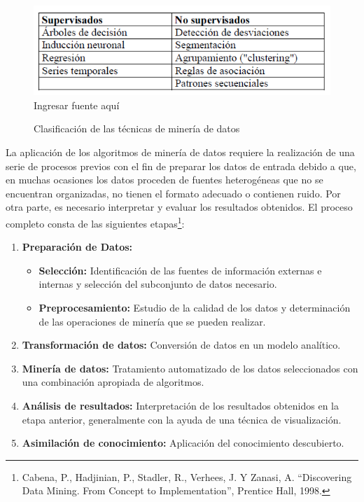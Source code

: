 \documentclass[a4paper,openright,12pt]{book}
\theoremstyle{definition}
\theoremstyle{remark}
\begin{document}
\begin{figure}[ht]
\centering
\caption{Clasificación de las técnicas de minería de datos} 
\includegraphics[scale=0.7]{Tabla1}
\label{fig:Tabla1}
\\Ingresar fuente aquí
\end{figure}

La aplicación de los algoritmos de minería de datos requiere la realización de una serie de procesos previos con el fin de  preparar los datos de entrada debido a que, en muchas ocasiones los datos proceden de fuentes heterogéneas que no se encuentran organizadas, no tienen el formato adecuado o
contienen ruido. Por otra parte, es necesario interpretar y evaluar los resultados obtenidos. El proceso completo consta de las siguientes etapas\footnote{Cabena, P., Hadjinian, P., Stadler, R., Verhees, J. Y Zanasi, A.
“Discovering Data Mining. From Concept to Implementation”, Prentice Hall, 1998.}:

\begin{enumerate}
\item \textbf{Preparación de Datos:}
	\begin{itemize}
		\item \textbf{Selección:} Identificación de las fuentes de información externas e internas y selección del subconjunto de datos necesario.
        \item \textbf{Preprocesamiento:} Estudio de la calidad de los datos y determinación de las operaciones de minería que se pueden realizar.
\end{itemize}
\item \textbf{Transformación de datos:} Conversión de datos en un modelo analítico.
\item \textbf{Minería de datos:} Tratamiento automatizado de los datos seleccionados con una combinación apropiada de algoritmos.
\item \textbf{Análisis de resultados:} Interpretación de los resultados obtenidos en la etapa anterior, generalmente con la ayuda de una técnica de visualización.
\item \textbf{Asimilación de conocimiento:} Aplicación del conocimiento descubierto.
\end{enumerate}
\end{document}
